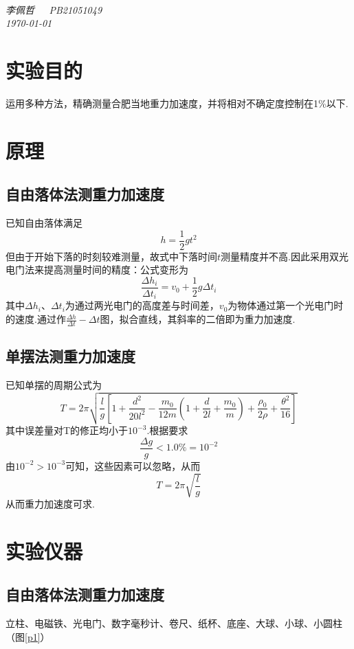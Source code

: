 \documentclass[a4paper]{article}%
\title{\heiti{实验报告}}%
\author{{\emph{李佩哲}}}
\date{\emph{\small\today}}
\begin{document}
\begin{center}
\\
\emph{李佩哲~~~PB21051049~~~\\\today}
\end{center}
\section{实验目的}
运用多种方法，精确测量合肥当地重力加速度，并将相对不确定度控制在1\%以下.

\section{原理}
\subsection{自由落体法测重力加速度}
已知自由落体满足$$h=\frac{1}{2}gt^2$$
但由于开始下落的时刻较难测量，故式中下落时间$t$测量精度并不高.因此采用双光电门法来提高测量时间的精度：公式变形为$$\frac{\Delta h_i}{\Delta t_i}=v_0+\frac{1}{2}g\Delta t_i$$
其中$\Delta h_i$、$\Delta t_i$为通过两光电门的高度差与时间差，$v_0$为物体通过第一个光电门时的速度.通过作$\frac{\Delta h}{\Delta t}-\Delta t$图，拟合直线，其斜率的二倍即为重力加速度.

\subsection{单摆法测重力加速度}
已知单摆的周期公式为$$T=2\pi\sqrt{\frac{l}{g}\left[1+\frac{d^2}{20l^2}-\frac{m_0}{12m}\left(1+\frac{d}{2l}+\frac{m_0}{m}\right)+\frac{\rho_0}{2\rho}+\frac{\theta^2}{16}\right]}$$
其中误差量对T的修正均小于$10^{-3}$.根据要求$$\frac{\Delta g}{g}<1.0\%=10^{-2}$$由$10^{-2}>10^{-3}$可知，这些因素可以忽略，从而
$$T=2\pi\sqrt{\frac{l}{g}}$$从而重力加速度可求.

\section{实验仪器}
\subsection{自由落体法测重力加速度}
立柱、电磁铁、光电门、数字毫秒计、卷尺、纸杯、底座、大球、小球、小圆柱（图\ref{p1}）
\end{document}
